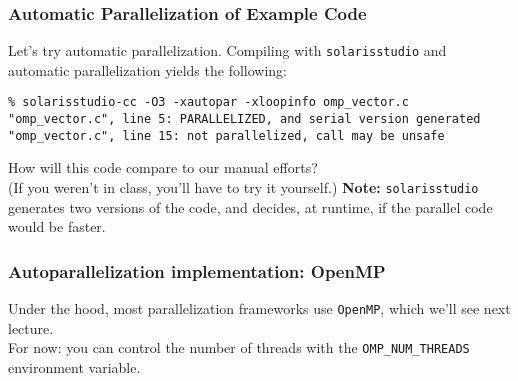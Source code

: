 \begin{frame}[fragile]
  \frametitle{Automatic Parallelization of Example Code}


  Let's try automatic parallelization.
  \vfill
  Compiling with {\tt solarisstudio} and automatic parallelization yields
  the following:


{\scriptsize
  \begin{lstlisting}
% solarisstudio-cc -O3 -xautopar -xloopinfo omp_vector.c 
"omp_vector.c", line 5: PARALLELIZED, and serial version generated                 
"omp_vector.c", line 15: not parallelized, call may be unsafe
  \end{lstlisting}
}

  How will this code compare to our manual efforts? \\
  (If you weren't in class, you'll have to try it yourself.)
  \vfill
  {\bf Note:} {\tt solarisstudio} generates two versions of the code, 
  and decides, at runtime, if the parallel code would be faster.


\end{frame}


\begin{frame}
  \frametitle{Autoparallelization implementation: OpenMP}


  Under the hood, most parallelization frameworks use {\tt OpenMP},
      which we'll see next lecture.\\[1em]
  For now: you can control the number of threads with the
      {\tt OMP\_NUM\_THREADS} environment variable.\\[1em]

\end{frame}

